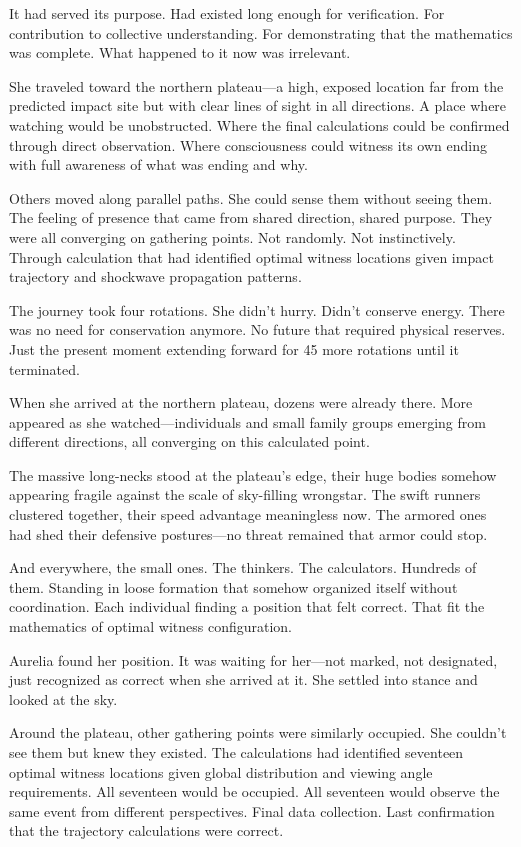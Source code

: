It had served its purpose. Had existed long enough for verification. For contribution to collective understanding. For demonstrating that the mathematics was complete. What happened to it now was irrelevant.

She traveled toward the northern plateau—a high, exposed location far from the predicted impact site but with clear lines of sight in all directions. A place where watching would be unobstructed. Where the final calculations could be confirmed through direct observation. Where consciousness could witness its own ending with full awareness of what was ending and why.

Others moved along parallel paths. She could sense them without seeing them. The feeling of presence that came from shared direction, shared purpose. They were all converging on gathering points. Not randomly. Not instinctively. Through calculation that had identified optimal witness locations given impact trajectory and shockwave propagation patterns.

The journey took four rotations. She didn't hurry. Didn't conserve energy. There was no need for conservation anymore. No future that required physical reserves. Just the present moment extending forward for 45 more rotations until it terminated.

When she arrived at the northern plateau, dozens were already there. More appeared as she watched—individuals and small family groups emerging from different directions, all converging on this calculated point.

The massive long-necks stood at the plateau's edge, their huge bodies somehow appearing fragile against the scale of sky-filling wrongstar. The swift runners clustered together, their speed advantage meaningless now. The armored ones had shed their defensive postures—no threat remained that armor could stop.

And everywhere, the small ones. The thinkers. The calculators. Hundreds of them. Standing in loose formation that somehow organized itself without coordination. Each individual finding a position that felt correct. That fit the mathematics of optimal witness configuration.

Aurelia found her position. It was waiting for her—not marked, not designated, just recognized as correct when she arrived at it. She settled into stance and looked at the sky.

Around the plateau, other gathering points were similarly occupied. She couldn't see them but knew they existed. The calculations had identified seventeen optimal witness locations given global distribution and viewing angle requirements. All seventeen would be occupied. All seventeen would observe the same event from different perspectives. Final data collection. Last confirmation that the trajectory calculations were correct.

